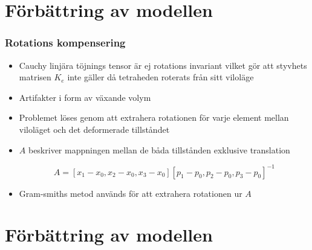 \documentclass{beamer}
\begin{document}
\section{Förbättring av modellen}


\begin{frame}
\frametitle{Rotations kompensering}

\begin{itemize}
\item Cauchy linjära töjnings tensor är ej rotations invariant vilket gör att styvhets matrisen $K_{e}$ inte gäller då tetraheden roterats från sitt viloläge

\item Artifakter i form av växande volym

\item Problemet löses genom att extrahera rotationen för varje element mellan viloläget och det deformerade tillståndet

\item $A$ beskriver mappningen mellan de båda tillstånden exklusive translation

\begin{equation}\label{eqn:stiffnessmatrix}
    A = [x_{1}-x_{0}, x_{2}-x_{0}, x_{3}-x_{0}][p_{1}-p_{0}, p_{2}-p_{0}, p_{3}-p_{0}]^{-1}
\end{equation}

\item Gram-smiths metod används för att extrahera rotationen ur $A$
\end{itemize}
\end{frame}

\section{Förbättring av modellen}
\end{document}
